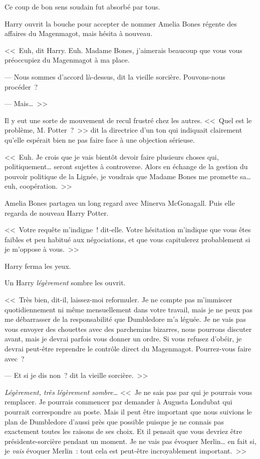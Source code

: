 Ce coup de bon sens soudain fut absorbé par tous.

Harry ouvrit la bouche pour accepter de nommer Amelia Bones régente des affaires du Magenmagot, mais hésita à nouveau.

<<~Euh, dit Harry. Euh. Madame Bones, j'aimerais beaucoup que vous vous préoccupiez du Magenmagot à ma place.

--- Nous sommes d'accord là-dessus, dit la vieille sorcière. Pouvons-nous procéder~?

--- Mais…~>>

Il y eut une sorte de mouvement de recul frustré chez les autres. <<~Quel est le problème, M. Potter~?~>> dit la directrice d'un ton qui indiquait clairement qu'elle espérait bien ne pas faire face à une objection sérieuse.

<<~Euh. Je crois que je vais bientôt devoir faire plusieurs choses qui, politiquement… seront sujettes à controverse. Alors en échange de la gestion du pouvoir politique de la Lignée, je voudrais que Madame Bones me promette sa… euh, coopération.~>>

Amelia Bones partagea un long regard avec Minerva McGonagall. Puis elle regarda de nouveau Harry Potter.

<<~Votre requête m'indigne~! dit-elle. Votre hésitation m'indique que vous êtes faibles et peu habitué aux négociations, et que vous capitulerez probablement si je m'oppose à vous.~>>

Harry ferma les yeux.

Un Harry \emph{légèrement} sombre les ouvrit.

<<~Très bien, dit-il, laissez-moi reformuler. Je ne compte pas m'immiscer quotidiennement ni même mensuellement dans votre travail, mais je ne peux pas me débarrasser de la responsabilité que Dumbledore m'a léguée. Je ne vais pas vous envoyer des chouettes avec des parchemins bizarres, nous pourrons discuter avant, mais je devrai parfois vous donner un ordre. Si vous refusez d'obéir, je devrai peut-être reprendre le contrôle direct du Magenmagot. Pourrez-vous faire avec~?

--- Et si je dis non~? dit la vieille sorcière.~>>

\emph{Légèrement, très légèrement sombre…} <<~Je ne sais pas par qui je pourrais vous remplacer. Je pourrais commencer par demander à Augusta Londubat qui pourrait correspondre au poste. Mais il peut être important que nous suivions le plan de Dumbledore d'aussi près que possible puisque je ne connais pas exactement toutes les raisons de ses choix. Et il pensait que vous devriez être présidente-sorcière pendant un moment. Je ne vais pas évoquer Merlin… en fait si, je \emph{vais} évoquer Merlin~: tout cela est peut-être incroyablement important.~>>

